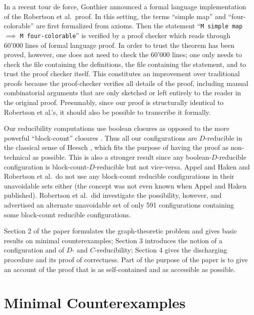 \documentclass[11pt]{article}
\begin{document}
In a recent tour de force, Gonthier \cite{gonthier} announced a formal language implementation of the Robertson et al.~proof. In this setting, the terms ``simple map'' and ``four-colorable'' are first formalized from axioms. Then the statement ``\texttt{M simple map} $\implies$ \texttt{M four-colorable}'' is verified by a proof checker
which reads through 60'000 lines of formal language proof. In order to trust the theorem has been proved, however, one does not need to check the 60'000 lines; one only needs to check the file containing the definitions, the file containing the statement, and to trust the proof checker 
itself. This constitutes an improvement over traditional proofs because the proof-checker verifies
all details of the proof, including manual combinatorial arguments that are only sketched or left entirely to the reader in the original proof. 
Presumably, since our proof is structurally identical to Robertson et al.'s, it should also be possible to transcribe it formally. 

Our reducibility computations use boolean closures as opposed to the more powerful ``block-count'' closures \cite{cohen, swart}. Thus all our configurations are $D$-reducible in the classical sense of Heesch \cite{heesch}, which fits the purpose of having the proof as non-technical as possible. This is also a stronger result since any boolean-$D$-reducible configuration is block-count-$D$-reducible but not vice-versa. Appel and Haken and Robertson et al.~do not use any block-count reducible configurations in their unavoidable sets either (the concept was not even known when Appel and Haken published). Robertson et al.~did investigate the possibility, however, and advertised an alternate unavoidable set of only 591 configurations containing some block-count reducible configurations.

Section 2 of the paper formulates the graph-theoretic problem and gives basic results on minimal counterexamples; Section 3 introduces the notion of a configuration and of $D$- and $C$-reducibility; Section 4 gives the discharging procedure and its proof of correctness. Part of the purpose of the paper is to give an account of the proof that is as self-contained and as accessible as possible. 

\section{Minimal Counterexamples}
\end{document}

